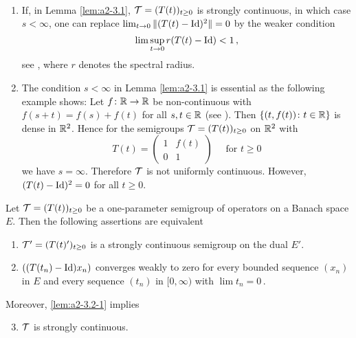 \begin{remarks*}\label{rem:a2-3.1-kgk} ~ 
\begin{enumerate}[\upshape (i), wide, labelindent=0.5em]
\item \label{rem:a2-3.1-kgk-1}
If, in Lemma \ref{lem:a2-3.1},    
$\mathcal{T} = (T(t))_{t \geq 0}$ is strongly continuous, in which case 
$s < \infty$, one can replace 
$\lim_{t \to 0} \|(T(t) - \operatorname{Id})^2\| = 0$ by the weaker condition 
\[
\lim \sup_{t \to 0} r(T(t) - \operatorname{Id}) < 1\,, \]
see \citet[Lemma 2]{lotz:1985}, where $r$ denotes the spectral radius.
\item \label{rem:a2-3.1-kgk-2}
The condition $s < \infty$ in Lemma \ref{lem:a2-3.1}   
is essential as the following example shows:
Let $f \colon \mathbb{R} \to \mathbb{R}$ be non-continuous with $f(s+t) = f(s) + f(t)$ for all $s, t \in \mathbb{R}$ (see \citet{hamel:1905}).
Then $\{(t,f(t)) \colon t \in \mathbb{R}\}$ is dense in $\mathbb{R}^2$.
Hence for the semigroups $\mathcal{T} = (T(t))_{t \geq 0}$ on $\mathbb{R}^2$ with
\[
T(t) = \left( \begin{array}{cc}
    1 & f(t) \\
    0 & 1
\end{array} \right) \quad  \text{ for } t \geq 0
\]
we have $s = \infty$.
Therefore $\mathcal{T}$ is not uniformly continuous.
However, $(T(t) - \operatorname{Id})^{2} = 0$ for all $t \geq 0$.
\end{enumerate}
\end{remarks*}


\begin{lemma}\label{lem:a2-3.2}
Let $\mathcal{T} = (T(t))_{t \geq 0}$ be a one-parameter semigroup of operators on a Banach space $E$.
Then the following assertions are equivalent
\begin{enumerate}[\upshape (a)]
\item \label{lem:a2-3.2-1}
$\mathcal{T}' = (T(t)')_{t \geq 0}$ is a strongly continuous semigroup on the dual $E'$.
\item \label{lem:a2-3.2-2}
$((T(t_{n}) - \operatorname{Id})x_n)$ converges weakly to zero for every bounded sequence $(x_n)$ in $E$ and every sequence $(t_n)$ in $[0,\infty)$ with $\lim t_n = 0$\,.
\end{enumerate}
Moreover, \ref{lem:a2-3.2-1}   
implies
\begin{enumerate}[\upshape (a)]
\setcounter{enumi}{2}
\item \label{lem:a2-3.2-3}
$\mathcal{T}$ is strongly continuous. 
\end{enumerate}
\end{lemma}

